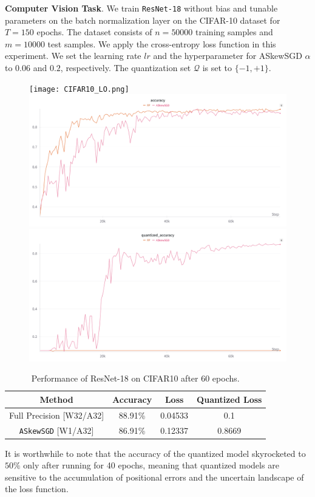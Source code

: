 \documentclass[10pt,a4paper]{article}
\begin{document}
\newpage
\textbf{Computer Vision Task}. We train \texttt{ResNet-18} without bias and tunable parameters on the batch normalization layer on the CIFAR-10 dataset for $T=150$ epochs. The dataset consists of $n=50000$ training samples and $m=10000$ test samples. We apply the cross-entropy loss function in this experiment. We set the learning rate $lr$ and the hyperparameter for ASkewSGD $\alpha$ to $0.06$ and $0.2$, respectively. The quantization set $\mathcal{Q}$ is set to $\{-1,+1\}$.
\begin{figure}[H]
  \centering
  \texttt{[image: CIFAR10\_LO.png]}
  \includegraphics[width=0.45\linewidth]{CIFAR10_AC.png}
  \includegraphics[width=0.45\linewidth]{CIFAR10_QA.png}
\end{figure}

\begin{table}[H]
  \caption{Performance of ResNet-18 on CIFAR10 after 60 epochs.} \label{Tb:tb1}
  \begin{center}
    \begin{tabular}{cccc}
      \hline
      Method                     & Accuracy & Loss    & Quantized Loss \\ \hline
      Full Precision [W32/A32]   & 88.91\%  & 0.04533 & 0.1            \\ \hline
      \texttt{ASkewSGD} [W1/A32] & 86.91\%  & 0.12337 & 0.8669         \\ \hline
    \end{tabular}
  \end{center}
\end{table}

It is worthwhile to note that the accuracy of the quantized model skyrocketed to $50\%$ only after running for 40 epochs, meaning that quantized models are sensitive to the accumulation of positional errors and the uncertain landscape of the loss function.
\end{document}
